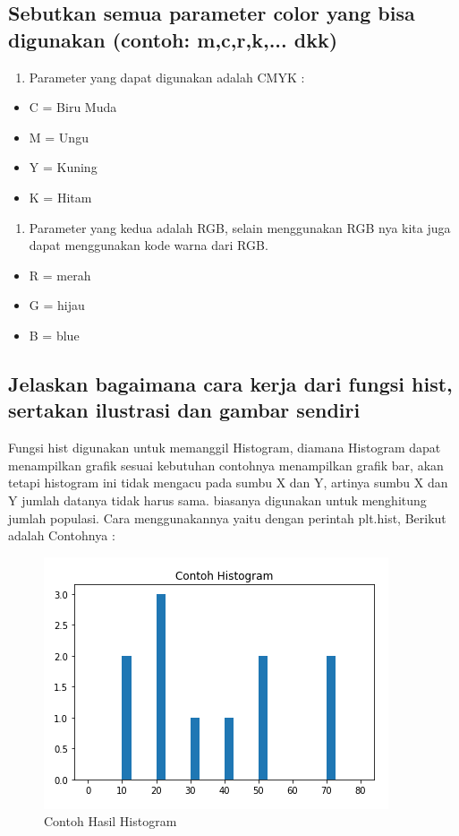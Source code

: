 \subsection{ Sebutkan semua parameter color yang bisa digunakan (contoh: m,c,r,k,... dkk)}
\begin{enumerate}
	\item Parameter yang dapat digunakan adalah CMYK :
\end{enumerate}
 
\begin{itemize}
	\item C = Biru Muda
	\item M = Ungu
	\item Y = Kuning
	\item K = Hitam
\end{itemize}

\begin{enumerate}
	\item Parameter yang kedua adalah RGB, selain menggunakan RGB nya kita juga dapat menggunakan kode warna dari RGB.
\end{enumerate}

\begin{itemize}
	\item R = merah
	\item G = hijau
	\item B = blue
\end{itemize}

\subsection{Jelaskan bagaimana cara kerja dari fungsi hist, sertakan ilustrasi dan gambar sendiri}
Fungsi hist digunakan untuk memanggil Histogram, diamana Histogram dapat menampilkan grafik sesuai kebutuhan contohnya menampilkan grafik bar, akan tetapi histogram ini tidak mengacu pada sumbu X dan Y, artinya sumbu X dan Y jumlah datanya tidak harus sama. biasanya digunakan untuk menghitung jumlah populasi.\newline
	Cara menggunakannya yaitu dengan perintah plt.hist, Berikut adalah Contohnya :

	

\begin{figure}[h]
\centering
\includegraphics[scale=0.7]{figures/6/Teori/1174002/no3histogram.png}
\caption{Contoh Hasil Histogram}
\label{fig:contoh}
\end{figure}

